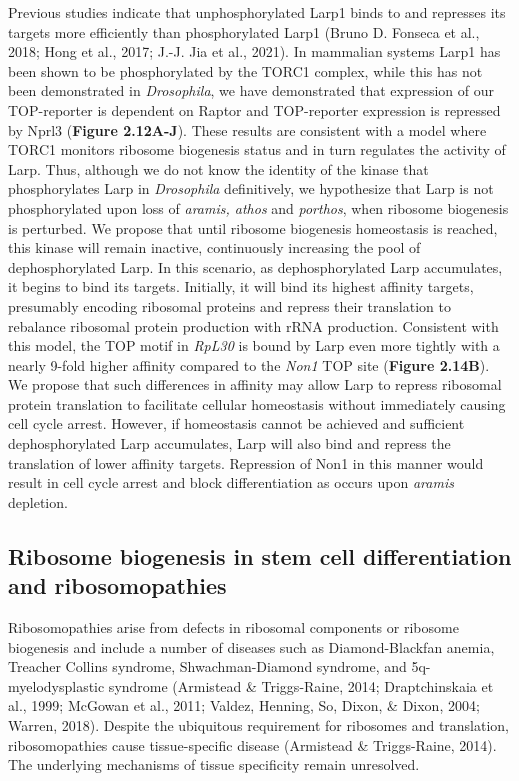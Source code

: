 \documentclass[12pt,oneside]{reedthesis}
\begin{document}
Previous studies indicate that unphosphorylated Larp1 binds to and
represses its targets more efficiently than phosphorylated Larp1
(Bruno D. Fonseca et al., 2018; Hong et al., 2017; J.-J. Jia et al., 2021). In mammalian systems Larp1 has been shown
to be phosphorylated by the TORC1 complex, while this has not been
demonstrated in \emph{Drosophila}, we have demonstrated that expression of
our TOP-reporter is dependent on Raptor and TOP-reporter expression is
repressed by Nprl3 (\textbf{Figure 2.12A-J}). These results are consistent with
a model where TORC1 monitors ribosome biogenesis status and in turn
regulates the activity of Larp. Thus, although we do not know the
identity of the kinase that phosphorylates Larp in \emph{Drosophila}
definitively, we hypothesize that Larp is not phosphorylated upon loss
of \emph{aramis, athos} and \emph{porthos}, when ribosome biogenesis is perturbed.
We propose that until ribosome biogenesis homeostasis is reached, this
kinase will remain inactive, continuously increasing the pool of
dephosphorylated Larp. In this scenario, as dephosphorylated Larp
accumulates, it begins to bind its targets. Initially, it will bind its
highest affinity targets, presumably encoding ribosomal proteins and
repress their translation to rebalance ribosomal protein production with
rRNA production. Consistent with this model, the TOP motif in \emph{RpL30} is
bound by Larp even more tightly with a nearly 9-fold higher affinity
compared to the \emph{Non1} TOP site (\textbf{Figure 2.14B}). We propose that such
differences in affinity may allow Larp to repress ribosomal protein
translation to facilitate cellular homeostasis without immediately
causing cell cycle arrest. However, if homeostasis cannot be achieved
and sufficient dephosphorylated Larp accumulates, Larp will also bind
and repress the translation of lower affinity targets. Repression of
Non1 in this manner would result in cell cycle arrest and block
differentiation as occurs upon \emph{aramis} depletion.

\hypertarget{ribosome-biogenesis-in-stem-cell-differentiation-and-ribosomopathies}{%
\subsection{Ribosome biogenesis in stem cell differentiation and ribosomopathies}\label{ribosome-biogenesis-in-stem-cell-differentiation-and-ribosomopathies}}

Ribosomopathies arise from defects in ribosomal components or ribosome
biogenesis and include a number of diseases such as Diamond-Blackfan
anemia, Treacher Collins syndrome, Shwachman-Diamond syndrome, and
5q-myelodysplastic syndrome (Armistead \& Triggs-Raine, 2014; Draptchinskaia et al., 1999; McGowan et al., 2011; Valdez, Henning, So, Dixon, \& Dixon, 2004; Warren, 2018).
Despite the ubiquitous requirement for ribosomes and translation,
ribosomopathies cause tissue-specific disease (Armistead \& Triggs-Raine, 2014). The
underlying mechanisms of tissue specificity remain unresolved.
\end{document}

